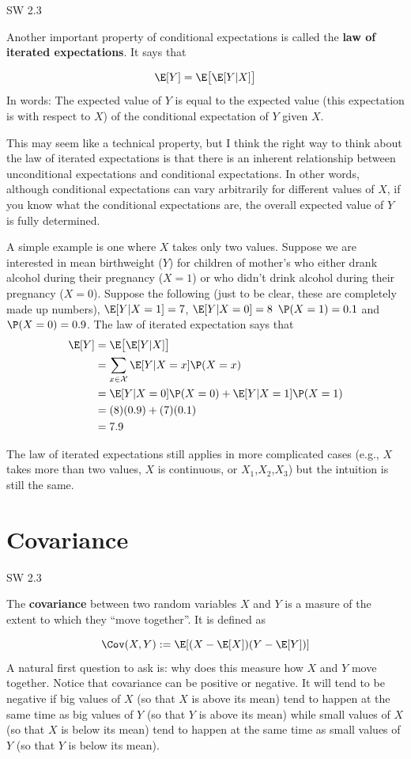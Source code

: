 \documentclass[
  letterpaper,
  DIV=11,
  numbers=noendperiod]{scrreprt}
\begin{document}
SW 2.3

Another important property of conditional expectations is called the
\textbf{law of iterated expectations}. It says that

\[
  \E[Y] = \E\big[ \E[Y|X] \big]
\] In words: The expected value of \(Y\) is equal to the expected value
(this expectation is with respect to \(X\)) of the conditional
expectation of \(Y\) given \(X\).

This may seem like a technical property, but I think the right way to
think about the law of iterated expectations is that there is an
inherent relationship between unconditional expectations and conditional
expectations. In other words, although conditional expectations can vary
arbitrarily for different values of \(X\), if you know what the
conditional expectations are, the overall expected value of \(Y\) is
fully determined.

A simple example is one where \(X\) takes only two values. Suppose we
are interested in mean birthweight (\(Y\)) for children of mother's who
either drank alcohol during their pregnancy (\(X=1\)) or who didn't
drink alcohol during their pregnancy (\(X=0\)). Suppose the following
(just to be clear, these are completely made up numbers),
\(\E[Y|X=1] = 7\), \(\E[Y|X=0]=8\) \(\P(X=1) = 0.1\) and
\(\P(X=0)=0.9\). The law of iterated expectation says that \[
  \begin{aligned}
  \E[Y] &= \E\big[ \E[Y|X] \big] \\
  &= \sum_{x \in \mathcal{X}} \E[Y|X=x] \P(X=x) \\
  &= \E[Y|X=0]\P(X=0) + \E[Y|X=1]\P(X=1) \\
  &= (8)(0.9) + (7)(0.1) \\
  &= 7.9
  \end{aligned}
\]

The law of iterated expectations still applies in more complicated cases
(e.g., \(X\) takes more than two values, \(X\) is continuous, or
\(X_1\),\(X_2\),\(X_3\)) but the intuition is still the same.

\section{Covariance}\label{covariance}

SW 2.3

The \textbf{covariance} between two random variables \(X\) and \(Y\) is
a masure of the extent to which they ``move together''. It is defined as

\[
  \Cov(X,Y) := \E[(X-\E[X])(Y-\E[Y])]
\] A natural first question to ask is: why does this measure how \(X\)
and \(Y\) move together. Notice that covariance can be positive or
negative. It will tend to be negative if big values of \(X\) (so that
\(X\) is above its mean) tend to happen at the same time as big values
of \(Y\) (so that \(Y\) is above its mean) while small values of \(X\)
(so that \(X\) is below its mean) tend to happen at the same time as
small values of \(Y\) (so that \(Y\) is below its mean).
\end{document}
